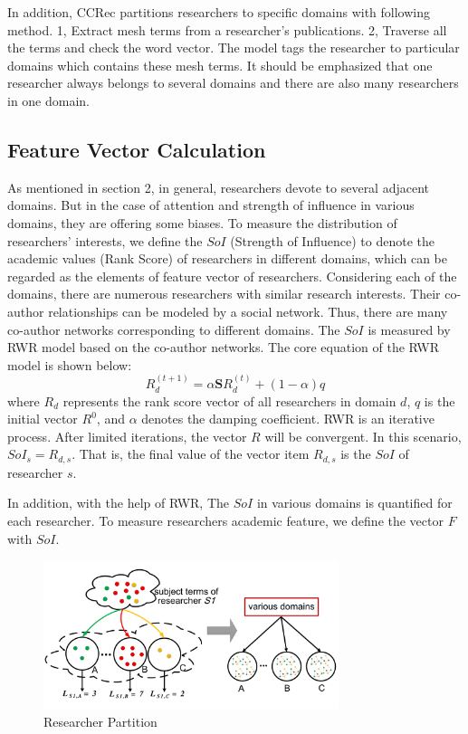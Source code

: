 \documentclass{acm_proc_article-sp}
\begin{document}
In addition, CCRec partitions researchers to specific domains with following method. 1, Extract mesh terms from a researcher's publications. 2, Traverse all the terms and check the word vector. The model tags the researcher to particular domains which contains these mesh terms. It should be emphasized that one researcher always belongs to several domains and there are also many researchers in one domain.

\subsection{Feature Vector Calculation}
As mentioned in section 2, in general, researchers devote to several adjacent domains. But in the case of attention and strength of influence in various domains, they are offering some biases. To measure the distribution of researchers' interests, we define the $SoI$ (Strength of Influence) to denote the academic values (Rank Score) of researchers in different domains, which can be regarded as the elements of feature vector of researchers. Considering each of the domains, there are numerous researchers with similar research interests. Their co-author relationships can be modeled by a social network. Thus, there are many co-author networks corresponding to different domains. The $SoI$ is measured by RWR model based on the co-author networks. The core equation of the RWR model is shown below:
\begin{equation}
R_{d}^{(t+1)}=\alpha \mathbf{S}R_{d}^{(t)}+(1-\alpha)q
\end{equation}
where $R_{d}$ represents the rank score vector of all researchers in domain $d$, $q$ is the initial vector $R^0$, and $\alpha$ denotes the damping coefficient. RWR is an iterative process. After limited iterations, the vector $R$ will be convergent. In this scenario, $SoI_{s}=R_{d,s}$. That is, the final value of the vector item $R_{d,s}$ is the $SoI$ of researcher $s$.


In addition, with the help of RWR, The $SoI$ in various domains is quantified for each researcher. To measure researchers academic feature, we define the vector $F$ with $SoI$.

\begin{figure}
\centering
\includegraphics [width=3.4in]{Fig5.pdf}
\caption{Researcher Partition}
\end{figure}
\end{document}
